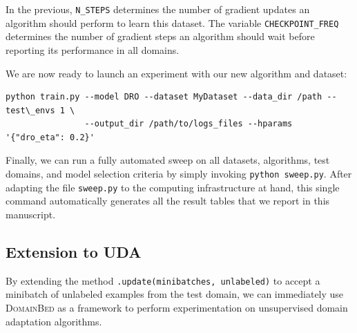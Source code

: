 \documentclass{article}
\newcommand{\domainbed}{\textsc{DomainBed}\xspace}
\begin{document}
\scalebox{0.75}{\usebox{\lstb}}

In the previous, \texttt{N\_STEPS} determines the number of gradient updates an algorithm should perform to learn this dataset.
%
The variable \texttt{CHECKPOINT\_FREQ} determines the number of gradient steps an algorithm should wait before reporting its performance in all domains.

We are now ready to launch an experiment with our new algorithm and dataset:

\newsavebox{\lstd}
\begin{lrbox}{\lstd}
\begin{lstlisting}
python train.py --model DRO --dataset MyDataset --data_dir /path --test\_envs 1 \
                --output_dir /path/to/logs_files --hparams '{"dro_eta": 0.2}'
\end{lstlisting}
\end{lrbox}

\scalebox{0.75}{\usebox{\lstd}}

Finally, we can run a fully automated sweep on all datasets, algorithms, test domains, and model selection criteria by simply invoking \texttt{python sweep.py}. After adapting the file \texttt{sweep.py} to the computing infrastructure at hand, this single command automatically generates all the result tables that we report in this manuscript. 

\subsection{Extension to UDA}

By extending the method \texttt{.update(minibatches, unlabeled)} to accept a minibatch of unlabeled examples from the test domain, we can immediately use \domainbed as a framework to perform experimentation on unsupervised domain adaptation algorithms.
\end{document}
